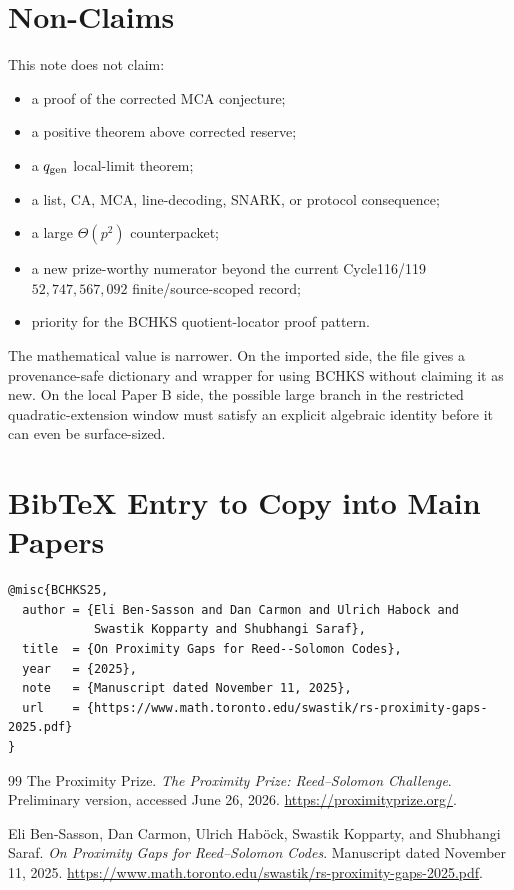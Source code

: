 \documentclass[11pt]{article}
\newcommand{\qgen}{q_{\rm gen}}
\begin{document}
\section{Non-Claims}
\label{sec:nonclaims}

This note does not claim:
\begin{itemize}
\item a proof of the corrected MCA conjecture;
\item a positive theorem above corrected reserve;
\item a \(\qgen\) local-limit theorem;
\item a list, CA, MCA, line-decoding, SNARK, or protocol consequence;
\item a large \(\Theta(p^2)\) counterpacket;
\item a new prize-worthy numerator beyond the current Cycle116/119
  \(52{,}747{,}567{,}092\) finite/source-scoped record;
\item priority for the BCHKS quotient-locator proof pattern.
\end{itemize}

The mathematical value is narrower.  On the imported side, the file gives a
provenance-safe dictionary and wrapper for using BCHKS without claiming it as
new.  On the local Paper B side, the possible large branch in the restricted
quadratic-extension window must satisfy an explicit algebraic identity before
it can even be surface-sized.

\appendix

\section{BibTeX Entry to Copy into Main Papers}

\begin{verbatim}
@misc{BCHKS25,
  author = {Eli Ben-Sasson and Dan Carmon and Ulrich Habock and
            Swastik Kopparty and Shubhangi Saraf},
  title  = {On Proximity Gaps for Reed--Solomon Codes},
  year   = {2025},
  note   = {Manuscript dated November 11, 2025},
  url    = {https://www.math.toronto.edu/swastik/rs-proximity-gaps-2025.pdf}
}
\end{verbatim}

\begin{thebibliography}{99}
The Proximity Prize.  \emph{The Proximity Prize: Reed--Solomon Challenge}.
Preliminary version, accessed June 26, 2026.
\url{https://proximityprize.org/}.

Eli Ben-Sasson, Dan Carmon, Ulrich Hab\"ock, Swastik Kopparty, and Shubhangi
Saraf.  \emph{On Proximity Gaps for Reed--Solomon Codes}.  Manuscript dated
November 11, 2025.
\url{https://www.math.toronto.edu/swastik/rs-proximity-gaps-2025.pdf}.
\end{thebibliography}
\end{document}
